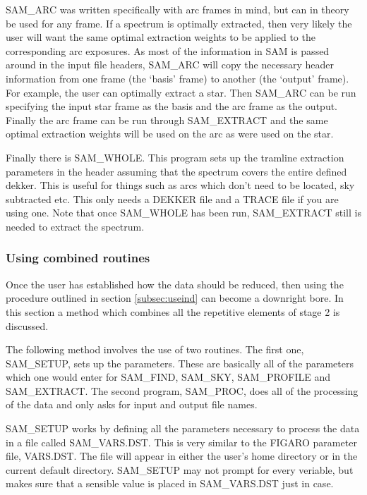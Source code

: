 SAM\_ARC was written specifically with arc frames in mind, but can in theory
be used for any frame.  If a spectrum is optimally extracted, then very likely
the user will want the same optimal extraction weights to be applied to the
corresponding arc exposures.  As most of the information in SAM is passed
around in the input file headers, SAM\_ARC will copy the necessary header 
information from one frame (the `basis' frame) to another (the `output'
frame).  For example, the user can optimally extract a star. Then SAM\_ARC can
be run specifying the input star frame as the basis and the arc frame as the
output.  Finally the arc frame can be run through SAM\_EXTRACT and the same
optimal extraction weights will be used on the arc as were used on the star.

Finally there is SAM\_WHOLE.  This program sets up the tramline extraction
parameters in the header assuming that the spectrum covers the entire defined
dekker.  This is useful for things such as arcs which don't need to be
located, sky subtracted etc.  This only needs a DEKKER file and a TRACE file
if you are using one. Note that once SAM\_WHOLE has been run, SAM\_EXTRACT
still is needed to extract the spectrum.

\subsubsection{Using combined routines}

Once the user has established how the data should be reduced, then using the
procedure outlined in section \ref{subsec:useind} can become a downright bore. 
In this section a method which combines all the repetitive elements of stage 2
is discussed.

The following method involves the use of two routines.  The first one,
SAM\_SETUP, sets up the parameters.  These are basically all of the parameters
which one would enter for SAM\_FIND, SAM\_SKY, SAM\_PROFILE and SAM\_EXTRACT.
The second program, SAM\_PROC, does all of the processing of the data and only
asks for input and output file names.

SAM\_SETUP works by defining all the parameters necessary to process the data
in a file called SAM\_VARS.DST.  This is very similar to the FIGARO parameter
file, VARS.DST.  The file will appear in either the user's home directory or
in the current default directory.  SAM\_SETUP may not prompt for every
veriable, but makes sure that a sensible value is placed in SAM\_VARS.DST just
in case.

